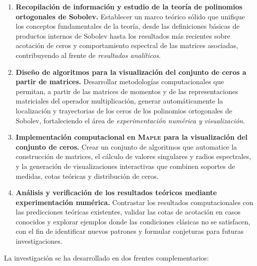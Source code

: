 \begin{enumerate}
	\item \textbf{Recopilación de información y estudio de la teoría de polinomios ortogonales de Sobolev.}
	      Establecer un marco teórico sólido que unifique los conceptos fundamentales de la teoría, desde las definiciones básicas de productos internos de Sobolev hasta los resultados más recientes sobre acotación de ceros y comportamiento espectral de las matrices asociadas, contribuyendo al frente de \emph{resultados analíticos}.

	\item \textbf{Diseño de algoritmos para la visualización del conjunto de ceros a partir de matrices.}
	      Desarrollar metodologías computacionales que permitan, a partir de las matrices de momentos y de las representaciones matriciales del operador multiplicación, generar automáticamente la localización y trayectorias de los ceros de los polinomios ortogonales de Sobolev, fortaleciendo el área de \emph{experimentación numérica y visualización}.

	\item \textbf{Implementación computacional en \textsc{Maple} para la visualización del conjunto de ceros.}
	      Crear un conjunto de algoritmos que automatice la construcción de matrices, el cálculo de valores singulares y radios espectrales, y la generación de visualizaciones interactivas que combinen soportes de medidas, cotas teóricas y distribución de ceros.

	\item \textbf{Análisis y verificación de los resultados teóricos mediante experimentación numérica.}
	      Contrastar los resultados computacionales con las predicciones teóricas existentes, validar las cotas de acotación en casos conocidos y explorar ejemplos donde las condiciones clásicas no se satisfacen, con el fin de identificar nuevos patrones y formular conjeturas para futuras investigaciones.
\end{enumerate}

La investigación se ha desarrollado en dos frentes complementarios:


